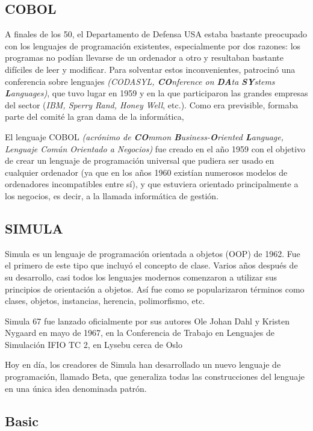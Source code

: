 \documentclass[twoside,twocolumn]{article}
\begin{document}
\subsection{COBOL}

A finales de los 50, el Departamento de Defensa
USA estaba bastante preocupado con los lenguajes de
programación existentes, especialmente por dos razones: los programas no podían llevarse de un ordenador
a otro y resultaban bastante difíciles de leer y modificar.
Para solventar estos inconvenientes, patrocinó una
conferencia sobre lenguajes \textit{(CODASYL, \textbf{CO}nference
on \textbf{DA}ta \textbf{SY}stems \textbf{L}anguages)}, que tuvo lugar en 1959
y en la que participaron las grandes empresas del sector (\textit{IBM, Sperry Rand, Honey Well}, etc.). Como era
previsible, formaba parte del comité la gran dama de la
informática,

El lenguaje COBOL \textit{(acrónimo de \textbf{CO}mmon \textbf{B}usiness-\textbf{O}riented \textbf{L}anguage, Lenguaje Común Orientado a Negocios)} fue creado en el año 1959 con el objetivo de crear un lenguaje de programación universal que pudiera ser usado en cualquier ordenador (ya que en los años 1960 existían numerosos modelos de ordenadores incompatibles entre sí), y que estuviera orientado principalmente a los negocios, es decir, a la llamada informática de gestión.

\subsection{SIMULA}

Simula es un lenguaje de programación orientada a objetos (OOP) de 1962. Fue el primero de este tipo que incluyó el concepto de clase. Varios años después de su desarrollo, casi todos los lenguajes modernos comenzaron a utilizar sus principios de orientación a objetos. Así fue como se popularizaron términos como clases, objetos, instancias, herencia, polimorfismo, etc.

Simula 67 fue lanzado oficialmente por sus autores Ole Johan Dahl y Kristen Nygaard en mayo de 1967, en la Conferencia de Trabajo en Lenguajes de Simulación IFIO TC 2, en Lysebu cerca de Oslo

Hoy en día, los creadores de Simula han desarrollado un nuevo lenguaje de programación, llamado Beta, que generaliza todas las construcciones del lenguaje en una única idea denominada patrón.

\subsection{Basic}
\end{document}
